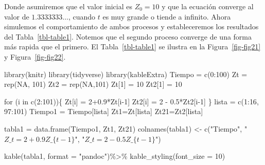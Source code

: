\documentclass[
  a4paper,
]{article}
\newenvironment{Shaded}{}{}
\newcommand{\AttributeTok}[1]{\textcolor[rgb]{0.84,0.23,0.29}{#1}}
\newcommand{\ConstantTok}[1]{\textcolor[rgb]{0.00,0.36,0.77}{#1}}
\newcommand{\ControlFlowTok}[1]{\textcolor[rgb]{0.84,0.23,0.29}{#1}}
\newcommand{\DecValTok}[1]{\textcolor[rgb]{0.00,0.36,0.77}{#1}}
\newcommand{\FloatTok}[1]{\textcolor[rgb]{0.00,0.36,0.77}{#1}}
\newcommand{\FunctionTok}[1]{\textcolor[rgb]{0.44,0.26,0.76}{#1}}
\newcommand{\NormalTok}[1]{\textcolor[rgb]{0.14,0.16,0.18}{#1}}
\newcommand{\OtherTok}[1]{\textcolor[rgb]{0.44,0.26,0.76}{#1}}
\newcommand{\SpecialCharTok}[1]{\textcolor[rgb]{0.00,0.36,0.77}{#1}}
\newcommand{\StringTok}[1]{\textcolor[rgb]{0.01,0.18,0.38}{#1}}
\begin{document}
Donde asumiremos que el valor inicial es \(Z_0 = 10\) y que la ecuación
converge al valor de \(1.3333333 \ldots\), cuando \(t\) es muy grande o
tiende a infinito. Ahora simulemos el comportamiento de ambos procesos y
estableceremos los resultados del Tabla~\ref{tbl-table1}. Notemos que el
segundo proceso converge de una forma más rapida que el primero. El
Tabla~\ref{tbl-table1} se ilustra en la Figura~\ref{fig-fig21} y
Figura~\ref{fig-fig22}.

\begin{Shaded}
\begin{Highlighting}[]
\FunctionTok{library}\NormalTok{(knitr)}
\FunctionTok{library}\NormalTok{(tidyverse)}
\FunctionTok{library}\NormalTok{(kableExtra)}
\NormalTok{Tiempo }\OtherTok{=} \FunctionTok{c}\NormalTok{(}\DecValTok{0}\SpecialCharTok{:}\DecValTok{100}\NormalTok{)}
\NormalTok{Zt }\OtherTok{=} \FunctionTok{rep}\NormalTok{(}\ConstantTok{NA}\NormalTok{, }\DecValTok{101}\NormalTok{)}
\NormalTok{Zt2 }\OtherTok{=} \FunctionTok{rep}\NormalTok{(}\ConstantTok{NA}\NormalTok{,}\DecValTok{101}\NormalTok{)}
\NormalTok{Zt[}\DecValTok{1}\NormalTok{] }\OtherTok{=} \DecValTok{10}
\NormalTok{Zt2[}\DecValTok{1}\NormalTok{] }\OtherTok{=} \DecValTok{10}

\ControlFlowTok{for}\NormalTok{ (i }\ControlFlowTok{in} \FunctionTok{c}\NormalTok{(}\DecValTok{2}\SpecialCharTok{:}\DecValTok{101}\NormalTok{))\{}
\NormalTok{  Zt[i] }\OtherTok{=} \DecValTok{2}\FloatTok{+0.9}\SpecialCharTok{*}\NormalTok{Zt[i}\DecValTok{{-}1}\NormalTok{]}
\NormalTok{  Zt2[i] }\OtherTok{=} \DecValTok{2} \SpecialCharTok{{-}} \FloatTok{0.5}\SpecialCharTok{*}\NormalTok{Zt2[i}\DecValTok{{-}1}\NormalTok{]}
\NormalTok{\}}
\NormalTok{lista }\OtherTok{=} \FunctionTok{c}\NormalTok{(}\DecValTok{1}\SpecialCharTok{:}\DecValTok{16}\NormalTok{, }\DecValTok{97}\SpecialCharTok{:}\DecValTok{101}\NormalTok{)}
\NormalTok{Tiempo1 }\OtherTok{=}\NormalTok{ Tiempo[lista]}
\NormalTok{Zt1}\OtherTok{=}\NormalTok{Zt[lista]}
\NormalTok{Zt21}\OtherTok{=}\NormalTok{Zt2[lista]}


\NormalTok{tabla1 }\OtherTok{=} \FunctionTok{data.frame}\NormalTok{(Tiempo1, Zt1, Zt21)}
\FunctionTok{colnames}\NormalTok{(tabla1) }\OtherTok{\textless{}{-}} \FunctionTok{c}\NormalTok{(}\StringTok{"Tiempo"}\NormalTok{, }\StringTok{"$Z\_t =2+0.9Z\_\{t{-}1\}$"}\NormalTok{, }\StringTok{"$Z\_t = 2{-}0.5Z\_\{t{-}1\}$"}\NormalTok{)}

\FunctionTok{kable}\NormalTok{(tabla1, }\AttributeTok{format =} \StringTok{"pandoc"}\NormalTok{)}\SpecialCharTok{\%\textgreater{}\%}
  \FunctionTok{kable\_styling}\NormalTok{(}\AttributeTok{font\_size =} \DecValTok{10}\NormalTok{)}
\end{Highlighting}
\end{Shaded}
\end{document}
